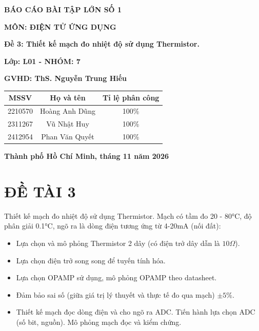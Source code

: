 \documentclass[12pt, a4paper, oneside]{article}
\begin{document}
\begin{titlepage}
\begin{center}
    \fontsize{18pt}{17pt}\selectfont 
    \textbf{BÁO CÁO BÀI TẬP LỚN SỐ 1}

    \textbf{MÔN: ĐIỆN TỬ ỨNG DỤNG}
\end{center}
\begin{center}
    \fontsize{15pt}{17pt}\selectfont 
    \textbf{\textrm{Đề 3: Thiết kế mạch đo nhiệt độ sử dụng Thermistor.}}
\end{center}

\begin{center}
    \vspace{15pt}
    \textbf{Lớp: L01 - NHÓM: 7}
    
    \textbf{GVHD: ThS. Nguyễn Trung Hiếu}
\end{center}

\vspace{10pt}

\begin{table}[h!]
\centering
\begin{tabular}{|c|c|c|}
\hline
\textbf{MSSV} & \textbf{Họ và tên} & \textbf{Tỉ lệ phân công} \\ \hline
2210570 & Hoàng Anh Dũng & 100\% \\ \hline
2311267 & Vũ Nhật Huy & 100\% \\ \hline
2412954 & Phan Văn Quyết & 100\% \\ \hline
\end{tabular}
\end{table}
\vfill
\centerline{\bf Thành phố Hồ Chí Minh, tháng 11 năm 2026}

\vspace{1cm}
\end{titlepage}
\newpage
\tableofcontents
\newpage
\listoffigures
\newpage
\section*{ĐỀ TÀI 3}
Thiết kế mạch đo nhiệt độ sử dụng Thermistor. Mạch có tầm đo 20 - 80°C, độ phân giải 0.1°C, ngõ ra là dòng điện tương ứng từ 4-20mA (nối đất):
\begin{itemize}
    \item[a.] Lựa chọn và mô phỏng Thermistor 2 dây (có điện trở dây dẫn là $10 \varOmega$).
    \item[b.] Lựa chọn điện trở song song để tuyến tính hóa.
    \item[c.] Lựa chọn OPAMP sử dụng, mô phỏng OPAMP theo datasheet.
    \item[d.] Đảm bảo sai số (giữa giá trị lý thuyết và thực tế đo qua mạch) $\pm 5\%$.
    \item[e.] Thiết kế mạch đọc dòng điện và cho ngõ ra ADC. Tiến hành lựa chọn ADC (số bit, nguồn). Mô phỏng mạch đọc và kiểm chứng.
\end{itemize}

\newpage





\end{document}
